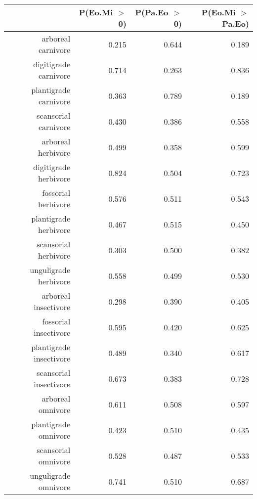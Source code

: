 \begin{table}[ht]
\centering
\begin{tabular}{rrrr}
  \hline
 & P(Eo.Mi $>$ 0) & P(Pa.Eo $>$ 0) & P(Eo.Mi $>$ Pa.Eo) \\ 
  \hline
arboreal carnivore & 0.215 & 0.644 & 0.189 \\ 
  digitigrade carnivore & 0.714 & 0.263 & 0.836 \\ 
  plantigrade carnivore & 0.363 & 0.789 & 0.189 \\ 
  scansorial carnivore & 0.430 & 0.386 & 0.558 \\ 
  arboreal herbivore & 0.499 & 0.358 & 0.599 \\ 
  digitigrade herbivore & 0.824 & 0.504 & 0.723 \\ 
  fossorial herbivore & 0.576 & 0.511 & 0.543 \\ 
  plantigrade herbivore & 0.467 & 0.515 & 0.450 \\ 
  scansorial herbivore & 0.303 & 0.500 & 0.382 \\ 
  unguligrade herbivore & 0.558 & 0.499 & 0.530 \\ 
  arboreal insectivore & 0.298 & 0.390 & 0.405 \\ 
  fossorial insectivore & 0.595 & 0.420 & 0.625 \\ 
  plantigrade insectivore & 0.489 & 0.340 & 0.617 \\ 
  scansorial insectivore & 0.673 & 0.383 & 0.728 \\ 
  arboreal omnivore & 0.611 & 0.508 & 0.597 \\ 
  plantigrade omnivore & 0.423 & 0.510 & 0.435 \\ 
  scansorial omnivore & 0.528 & 0.487 & 0.533 \\ 
  unguligrade omnivore & 0.741 & 0.510 & 0.687 \\ 
   \hline
\end{tabular}
\label{tab:surv_plant}
\end{table}

